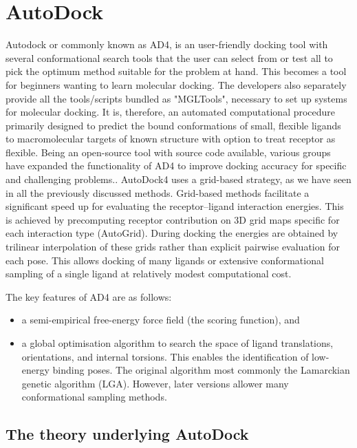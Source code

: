 \documentclass[12pt, a4paper]{article}
\begin{document}
\section{AutoDock}
Autodock or commonly known as AD4, is an user-friendly docking tool with several conformational search tools that the user can select from or test all to pick the optimum method suitable for the problem at hand. This becomes a tool for beginners wanting to learn molecular docking. The developers also separately provide all the tools/scripts bundled as "MGLTools", necessary to set up systems for molecular docking. It is, therefore, an automated computational procedure primarily designed to predict the bound conformations of small, flexible ligands to macromolecular targets of known structure with option to treat receptor as flexible. Being an open-source tool with source code available, various groups have expanded the functionality of AD4 to improve docking accuracy for specific and challenging problems.\cite{CH7_Morris1998,CH7_Morris2009}. 
AutoDock4 uses a grid-based strategy, as we have seen in all the previously discussed methods. Grid-based methods facilitate a significant speed up for evaluating the receptor--ligand interaction energies. This is achieved by precomputing receptor contribution on 3D grid maps specific for each interaction type (AutoGrid). During docking the energies are obtained by trilinear interpolation of these grids rather than explicit pairwise evaluation for each pose.\cite{CH7_Huey2007,CH7_Morris2009} This allows docking of many ligands or extensive conformational sampling of a single ligand at relatively modest computational cost. 

The key features of AD4 are as follows:

\begin{itemize}
  \item a semi-empirical free-energy force field (the scoring function), and
  \item a global optimisation algorithm to search the space of ligand translations, orientations, and internal torsions. This enables the identification of low-energy binding poses. The original algorithm most commonly the Lamarckian genetic algorithm (LGA). However, later versions allower many conformational sampling methods.
\end{itemize}



\subsection{The theory underlying AutoDock}
\end{document}
